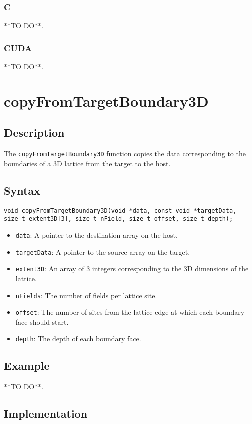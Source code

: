 \subsubsection{C}
**TO DO**.
\subsubsection{CUDA}
**TO DO**.

\newpage
\section{copyFromTargetBoundary3D}

\subsection{Description}

The \verb+copyFromTargetBoundary3D+ function copies the data corresponding to the boundaries of a 3D lattice from the target to the host.

\subsection{Syntax}
\begin{verbatim}
void copyFromTargetBoundary3D(void *data, const void *targetData, size_t extent3D[3], size_t nField, size_t offset, size_t depth);
\end{verbatim}

\begin{itemize}
\item \verb+data+: A pointer to the destination array on the host.
\item \verb+targetData+: A pointer to the source array on the target.
\item \verb+extent3D+: An array of 3 integers corresponding to the 3D dimensions of the lattice.
\item \verb+nFields+: The number of fields per lattice site.
\item \verb+offset+: The number of sites from the lattice edge at which each boundary face should start.
\item \verb+depth+: The depth of each boundary face.
\end{itemize}


\subsection{Example}
**TO DO**.
\subsection{Implementation}
